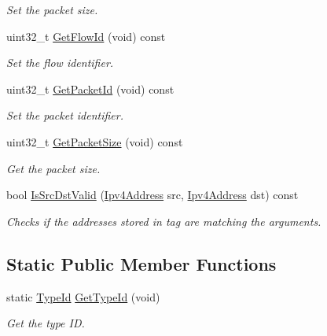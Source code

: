 \begin{DoxyCompactItemize}
\begin{DoxyCompactList}\small\item\em Set the packet size. \end{DoxyCompactList}\item 
uint32\+\_\+t \hyperlink{classns3_1_1Ipv4FlowProbeTag_a1476b97f2cf8cd07a7d585c36b33884d}{Get\+Flow\+Id} (void) const 
\begin{DoxyCompactList}\small\item\em Set the flow identifier. \end{DoxyCompactList}\item 
uint32\+\_\+t \hyperlink{classns3_1_1Ipv4FlowProbeTag_a802f284968ab324fbb4858d917c0ff05}{Get\+Packet\+Id} (void) const 
\begin{DoxyCompactList}\small\item\em Set the packet identifier. \end{DoxyCompactList}\item 
uint32\+\_\+t \hyperlink{classns3_1_1Ipv4FlowProbeTag_ac4d9a3a9b9e9683bc4e10e83fb96531a}{Get\+Packet\+Size} (void) const 
\begin{DoxyCompactList}\small\item\em Get the packet size. \end{DoxyCompactList}\item 
bool \hyperlink{classns3_1_1Ipv4FlowProbeTag_a9a2fad3034bbc13edb1231b3950ed561}{Is\+Src\+Dst\+Valid} (\hyperlink{classns3_1_1Ipv4Address}{Ipv4\+Address} src, \hyperlink{classns3_1_1Ipv4Address}{Ipv4\+Address} dst) const 
\begin{DoxyCompactList}\small\item\em Checks if the addresses stored in tag are matching the arguments. \end{DoxyCompactList}\end{DoxyCompactItemize}
\subsection*{Static Public Member Functions}
\begin{DoxyCompactItemize}
\item 
static \hyperlink{classns3_1_1TypeId}{Type\+Id} \hyperlink{classns3_1_1Ipv4FlowProbeTag_a8f6c80eb41f6ef140b91e30533419f84}{Get\+Type\+Id} (void)
\begin{DoxyCompactList}\small\item\em Get the type ID. \end{DoxyCompactList}\end{DoxyCompactItemize}
